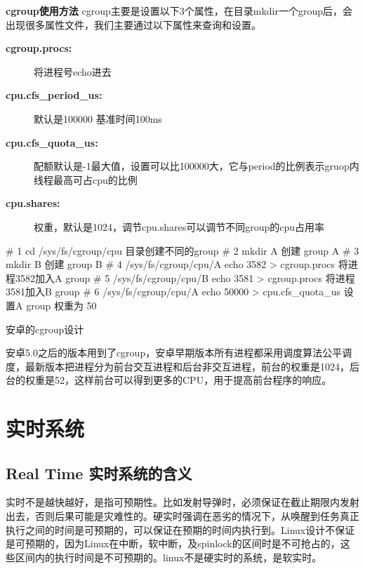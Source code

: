 \textbf{cgroup使用方法}
cgroup主要是设置以下3个属性，在目录mkdir一个group后，会出现很多属性文件，我们主要通过以下属性来查询和设置。

\begin{description}
  \item[\textbf{cgroup.procs:}] 将进程号echo进去
  \item[\textbf{cpu.cfs\_period\_us:}] 默认是100000 基准时间100ms
  \item[\textbf{cpu.cfs\_quota\_us:}] 配额默认是-1最大值，设置可以比100000大，它与period的比例表示gruop内线程最高可占cpu的比例
  \item[\textbf{cpu.shares:}] 权重，默认是1024，调节cpu.shares可以调节不同group的cpu占用率
\end{description}

\begin{latexcmd}[label= cgroup 操作方法]
# 1 cd /sys/fs/cgroup/cpu 目录创建不同的group
# 2 mkdir A  创建 group A
# 3 mkdir B  创建 group B
# 4 /sys/fs/cgroup/cpu/A  echo 3582 > cgroup.procs 将进程3582加入A group
# 5 /sys/fs/cgroup/cpu/B  echo 3581 > cgroup.procs 将进程3581加入B group
# 6 /sys/fs/cgroup/cpu/A  echo 50000 > cpu.cfs_quota_us
    设置A group 权重为 50%
\end{latexcmd}


\begin{example*}
  \wdexpbox
  {\caption{安卓的cgroup设计}}
  {安卓5.0之后的版本用到了cgroup，安卓早期版本所有进程都采用调度算法公平调度，最新版本把进程分为前台交互进程和后台非交互进程，前台的权重是1024，后台的权重是52，这样前台可以得到更多的CPU，用于提高前台程序的响应。}
\end{example*}


\chapter{实时系统}
\section{Real Time 实时系统的含义}
实时不是越快越好，是指可预期性。比如发射导弹时，必须保证在截止期限内发射出去，否则后果可能是灾难性的。硬实时强调在恶劣的情况下，从唤醒到任务真正执行之间的时间是可预期的，可以保证在预期的时间内执行到。Linux设计不保证是可预期的，因为Linux在中断，软中断，及spinlock的区间时是不可抢占的，这些区间内的执行时间是不可预期的。linux不是硬实时的系统，是软实时。
